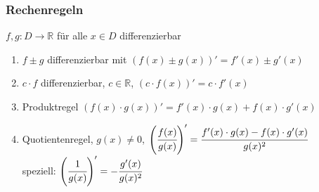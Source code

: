 \begin{center}
\label{Wurzelfunktion}
\end{center}


\subsubsection*{Rechenregeln} %
\label{sub:rechenregeln}

\( f,g:D\rightarrow\mathbb{R} \) für alle \( x \in D \) differenzierbar

\begin{enumerate}
	\item \( f \pm g \) differenzierbar mit \( (f(x)\pm g(x))'=f'(x)\pm g'(x) \)
	\item \( c \cdot f \) differenzierbar, \( c \in \mathbb{R} \), \( (c \cdot f(x))'=c\cdot f'(x) \)
	\item Produktregel \( (f(x) \cdot g(x))' = f'(x) \cdot g(x)+f(x) \cdot g'(x) \)
	\item Quotientenregel, \( g(x) \neq 0 \), \( \left(\cfrac{f(x)}{g(x)}\right)'=\cfrac{f'(x)\cdot g(x)-f(x)\cdot g'(x)}{g(x)^2} \) \\
          speziell: \( \left(\cfrac{1}{g(x)}\right)'=-\cfrac{g'(x)}{g(x)^2} \)
\end{enumerate}


